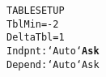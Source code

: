 \documentclass[a4paper, 12pt, french]{article}
\begin{document}
\begin{alltt}
TABLE SETUP
    TblMin=-2
    DeltaTbl=1
Indpnt: `Auto` \textbf{Ask}
Depend: `Auto` Ask
\end{alltt}
\end{document}

